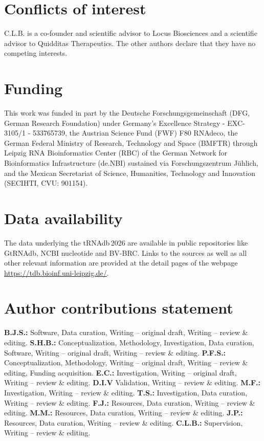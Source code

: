 \documentclass[unnumsec,webpdf,contemporary,large]{oup-authoring-template}
\begin{document}
\section{Conflicts of interest}
C.L.B. is a co-founder and scientific advisor to Locus Biosciences and a
scientific advisor to Quidditas Therapeutics. The other authors declare
that they have no competing interests.

\section{Funding}
This work was funded in part by the Deutsche Forschungsgemeinschaft (DFG,
German Research Foundation) under Germany's Excellence Strategy -
EXC-3105/1 - 533765739, the Austrian Science Fund (FWF) F80 RNAdeco, the
German Federal Ministry of Research, Technology and Space (BMFTR) through
Leipzig RNA Bioinformatics Center (RBC) of the German Network for
Bioinformatics Infrastructure (de.NBI) sustained via Forschungszent\-rum
J\"{u}hlich, {and the Mexican Secretariat of Science, Humanities, Technology and Innovation (SECIHTI, CVU: 901154).}

\section{Data availability}
The data underlying the tRNAdb\,2026 are available in public repositories
like GtRNAdb, NCBI nucleotide and BV-BRC. Links to the sources as well as
all other relevant information are provided at the detail pages of the
webpage \url{https://tdb.bioinf.uni-leipzig.de/}.

\section{Author contributions statement}
\textbf{B.J.S.:} Software, Data curation, Writing – original draft, Writing
– review \& editing. \textbf{S.H.B.:} Conceptualization, Methodology,
Investigation, Data curation, Software, Writing – original draft, Writing –
review \& editing. \textbf{P.F.S.:} Conceptualization, Methodology, Writing
– original draft, Writing – review \& editing, Funding
acquisition. \textbf{E.C.:} Investigation, Writing – original draft,
Writing – review \& editing. \textbf{D.I.V} Validation, Writing – review \&
editing. \textbf{M.F.:} Investigation, Writing – review \&
editing. \textbf{T.S.:} Investigation, Data curation, Writing – review \&
editing. \textbf{F.J.:} Resources, Data curation, Writing – review \&
editing. \textbf{M.M.:} Resources, Data curation, Writing – review \&
editing. \textbf{J.P.:} Resources, Data curation, Writing – review \&
editing. \textbf{C.L.B.:} Supervision, Writing – review \& editing.




\end{document}
